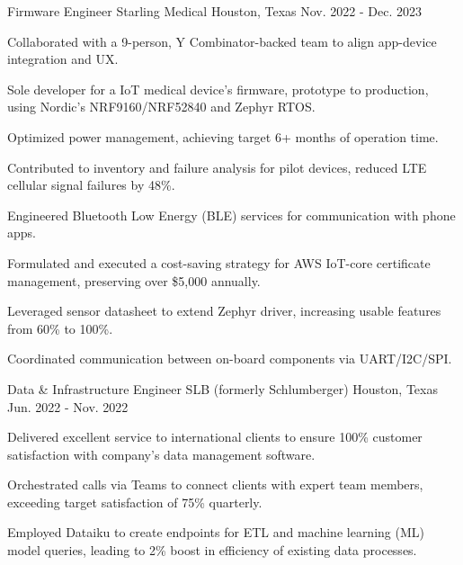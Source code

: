 

\begin{cventries}

  \cventry
    {Firmware Engineer} %
    {Starling Medical} %
    {Houston, Texas} %
    {Nov. 2022 - Dec. 2023} %
    {
      \begin{cvitems}
        \item {Collaborated with a 9-person, Y Combinator-backed team to align app-device integration and UX.}
        \item {Sole developer for a IoT medical device's firmware, prototype to production, using Nordic's NRF9160/NRF52840 and Zephyr RTOS.}
        \item {Optimized power management, achieving target 6+ months of operation time.}
        \item {Contributed to inventory and failure analysis for pilot devices, reduced LTE cellular signal failures by 48\%.}
        \item {Engineered Bluetooth Low Energy (BLE) services for communication with phone apps.}
        \item {Formulated and executed a cost-saving strategy for AWS IoT-core certificate management, preserving over \$5,000 annually.}
        \item {Leveraged sensor datasheet to extend Zephyr driver, increasing usable features from 60\% to 100\%.}
        \item {Coordinated communication between on-board components via UART/I2C/SPI.}
      \end{cvitems}
    }

  \cventry
    {Data \& Infrastructure Engineer} %
    {SLB (formerly Schlumberger)} %
    {Houston, Texas} %
    {Jun. 2022 - Nov. 2022} %
    {
      \begin{cvitems} %
        \item {Delivered excellent service to international clients to ensure 100\% customer satisfaction with company’s data management software.}
        \item {Orchestrated calls via Teams to connect clients with expert team members, exceeding target satisfaction of 75\% quarterly.}
        \item {Employed Dataiku to create endpoints for ETL and machine learning (ML) model queries, leading to 2\% boost in efficiency of existing data processes.}
      \end{cvitems}
    }


\end{cventries}
